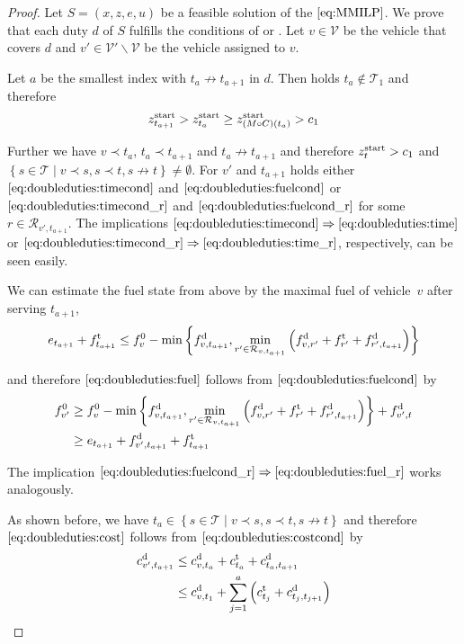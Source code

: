 \begin{proof}

Let $S=\left(x,z,e,u\right)$ be a feasible solution of the $\eqref{eq:MMILP}$. We prove that each duty $d$ of $S$ fulfills the conditions of  or . Let ${v\in\mathcal{V}}$ be the vehicle that covers $d$ and ${v'\in\mathcal{V}'\backslash\mathcal{V}}$ be the vehicle assigned to $v$.

Let $a$ be the smallest index with ${t_a\not\to t_{a+1}}$ in $d$. Then holds ${t_a\not\in\mathcal{T}_1}$ and therefore
\begin{align*}
	 z^{\operatorname{start}}_{t_{a+1}} > z^{\operatorname{start}}_{t_a} \geq z^{\operatorname{start}}_{\left(M\circ C\right)\left(t_a\right)} > c_1
\end{align*}

Further we have $v\prec t_a$, $t_a\prec t_{a+1}$ and $t_a\not\to t_{a+1}$ and therefore ${z^{\operatorname{start}}_t>c_1}$ and ${\left\{s\in\mathcal{T}\mid v\prec s, s\prec t, s\not\to t\right\}\neq\emptyset}$. For $v'$ and $t_{a+1}$ holds either $\eqref{eq:doubleduties:timecond}$ and $\eqref{eq:doubleduties:fuelcond}$ or $\eqref{eq:doubleduties:timecond_r}$ and $\eqref{eq:doubleduties:fuelcond_r}$ for some ${r\in\mathcal{R}_{v',t_{a+1}}}$. The implications ${\eqref{eq:doubleduties:timecond}\Rightarrow\eqref{eq:doubleduties:time}}$ or ${\eqref{eq:doubleduties:timecond_r}\Rightarrow\eqref{eq:doubleduties:time_r}}$, respectively, can be seen easily.

We can estimate the fuel state from above by the maximal fuel of vehicle~$v$ after serving $t_{a+1}$, \ie
\begin{align*}
	e_{t_{a+1}} + f^{\operatorname{t}}_{t_{a+1}} \leq f^0_v - \min\left\{f^{\operatorname{d}}_{v,t_{a+1}}, \min_{r'\in\mathcal{R}_{v,t_{a+1}}}\left(f^{\operatorname{d}}_{v,r'}+f^{\operatorname{t}}_{r'}+f^{\operatorname{d}}_{r',t_{a+1}}\right)\right\}
\end{align*}

and therefore $\eqref{eq:doubleduties:fuel}$ follows from $\eqref{eq:doubleduties:fuelcond}$ by
\begin{align*}
	f^0_{v'} & \geq f^0_v - \min\left\{f^{\operatorname{d}}_{v,t_{a+1}}, \min_{r'\in\mathcal{R}_{v,t_{a+1}}}\left(f^{\operatorname{d}}_{v,r'}+f^{\operatorname{t}}_{r'}+f^{\operatorname{d}}_{r',t_{a+1}}\right)\right\} + f^{\operatorname{d}}_{v',t} \\
	& \geq e_{t_{a+1}} + f^{\operatorname{d}}_{v',t_{a+1}} + f^{\operatorname{t}}_{t_{a+1}}
\end{align*}

The implication ${\eqref{eq:doubleduties:fuelcond_r}\Rightarrow\eqref{eq:doubleduties:fuel_r}}$ works analogously.

As shown before, we have ${t_a\in\left\{s\in\mathcal{T}\mid v\prec s, s\prec t, s\not\to t\right\}}$ and therefore $\eqref{eq:doubleduties:cost}$ follows from $\eqref{eq:doubleduties:costcond}$ by
\begin{align*}
	c^{\operatorname{d}}_{v',t_{a+1}} & \leq c^{\operatorname{d}}_{v,t_a} + c^{\operatorname{t}}_{t_a} + c^{\operatorname{d}}_{t_a,t_{a+1}} \\
	& \leq c^{\operatorname{d}}_{v,t_1} + \sum_{j=1}^a \left(c^{\operatorname{t}}_{t_j} + c^{\operatorname{d}}_{t_j,t_{j+1}}\right)
\end{align*}


\end{proof}
